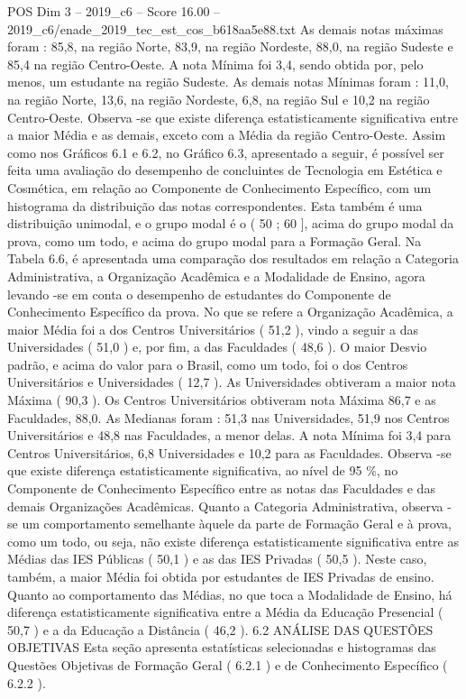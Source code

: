 \begin{textsample}{POS Dim 3 – 2019\_c6 – Score 16.00 – 2019\_c6/enade\_2019\_tec\_est\_cos\_b618aa5e88.txt}
As demais notas máximas foram : 85,8, na região Norte, 83,9, na região Nordeste, 88,0, na região Sudeste e 85,4 na região Centro-Oeste.
A nota Mínima foi 3,4, sendo obtida por, pelo menos, um estudante na região Sudeste.
As demais notas Mínimas foram : 11,0, na região Norte, 13,6, na região Nordeste, 6,8, na região Sul e 10,2 na região Centro-Oeste.
Observa -se que existe diferença estatisticamente significativa entre a maior Média e as demais, exceto com a Média da região Centro-Oeste.
Assim como nos Gráficos 6.1 e 6.2, no Gráfico 6.3, apresentado a seguir, é possível ser feita uma avaliação do desempenho de concluintes de Tecnologia em Estética e Cosmética, em relação ao Componente de Conhecimento Específico, com um histograma da distribuição das notas correspondentes.
Esta também é uma distribuição unimodal, e o grupo modal é o ( 50 ; 60 ], acima do grupo modal da prova, como um todo, e acima do grupo modal para a Formação Geral.
Na Tabela 6.6, é apresentada uma comparação dos resultados em relação a Categoria Administrativa, a Organização Acadêmica e a Modalidade de Ensino, agora levando -se em conta o desempenho de estudantes do Componente de Conhecimento Específico da prova.
No que se refere a Organização Acadêmica, a maior Média foi a dos Centros Universitários ( 51,2 ), vindo a seguir a das Universidades ( 51,0 ) e, por fim, a das Faculdades ( 48,6 ).
O maior Desvio padrão, e acima do valor para o Brasil, como um todo, foi o dos Centros Universitários e Universidades ( 12,7 ).
As Universidades obtiveram a maior nota Máxima ( 90,3 ).
Os Centros Universitários obtiveram nota Máxima 86,7 e as Faculdades, 88,0.
As Medianas foram : 51,3 nas Universidades, 51,9 nos Centros Universitários e 48,8 nas Faculdades, a menor delas.
A nota Mínima foi 3,4 para Centros Universitários, 6,8 Universidades e 10,2 para as Faculdades.
Observa -se que existe diferença estatisticamente significativa, ao nível de 95 \%, no Componente de Conhecimento Específico entre as notas das Faculdades e das demais Organizações Acadêmicas.
Quanto a Categoria Administrativa, observa -se um comportamento semelhante àquele da parte de Formação Geral e à prova, como um todo, ou seja, não existe diferença estatisticamente significativa entre as Médias das IES Públicas ( 50,1 ) e as das IES Privadas ( 50,5 ).
Neste caso, também, a maior Média foi obtida por estudantes de IES Privadas de ensino.
Quanto ao comportamento das Médias, no que toca a Modalidade de Ensino, há diferença estatisticamente significativa entre a Média da Educação Presencial ( 50,7 ) e a da Educação a Distância ( 46,2 ). 6.2 ANÁLISE DAS QUESTÕES OBJETIVAS Esta seção apresenta estatísticas selecionadas e histogramas das Questões Objetivas de Formação Geral ( 6.2.1 ) e de Conhecimento Específico ( 6.2.2 ).

\end{textsample}
